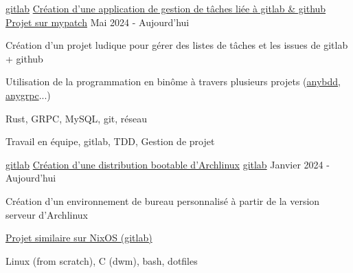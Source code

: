 

\begin{cventries}

	\cventry
	{\href{https://gitlab.com/patchme/any}{gitlab}} %
    {\href{https://gitlab.com/patchme/any}{Création d'une application de gestion de tâches liée à gitlab \& github}} %
	{\href{https://mypatch.fr/projects/any}{Projet sur mypatch}} %
	{Mai 2024 - Aujourd'hui} %
	{
		\begin{cvitems} %
			\item {Création d'un projet ludique pour gérer des listes de tâches et les issues de gitlab + github}
			\item {Utilisation de la programmation en binôme à travers plusieurs projets (\href{https://gitlab.com/patchme/anybdd}{anybdd}, \href{https://gitlab.com/patchme/anygrpc}{anygrpc}...)}
		\end{cvitems}
	}
	{
		\begin{cvitemsskills} %
			\item {Rust, GRPC, MySQL, git, réseau}
			\item {Travail en équipe, gitlab, TDD, Gestion de projet}
		\end{cvitemsskills}
	}

	\cventry
	{\href{https://gitlab.com/patchme/}{gitlab}} %
	{\href{https://gitlab.com/patchme/oh-my-arch}{Création d'une distribution bootable d'Archlinux}}
	{\href{https://gitlab.com/patchme/oh-my-arch}{gitlab}} %
	{Janvier 2024 - Aujourd'hui} %
	{
		\begin{cvitems} %
			\item {Création d'un environnement de bureau personnalisé à partir de la version serveur d'Archlinux}
			\item {\href{https://gitlab.com/patchme/any}{Projet similaire sur NixOS (gitlab)}}
		\end{cvitems}
	}
	{
		\begin{cvitemsskills} %
			\item {Linux (from scratch), C (dwm), bash, dotfiles}
		\end{cvitemsskills}
	}


\end{cventries}

